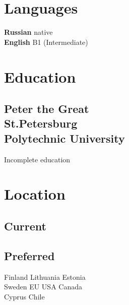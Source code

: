 \documentclass[]{schorscv}
\begin{document}
\begin{minipage}[t]{0.25\textwidth}


\section{Languages}
\sectionsep
\textbullet{} \textbf{Russian} native \\
\textbullet{} \textbf{English} B1 (Intermediate) \\
\sectionsep
\sectionsep


\section{Education} 
\subsection{Peter the Great \\ St.Petersburg \\ Polytechnic University}
Incomplete education \\
\sectionsep


\section{Location} 
\subsection{Current}
\sectionsep

\subsection{Preferred}
Finland \textbullet{} Lithuania \textbullet{} Estonia \\
Sweden \textbullet{} EU \textbullet{} USA  \textbullet{} Canada \\
Cyprus \textbullet{} Chile \\
\sectionsep



\end{minipage}
\end{document}
